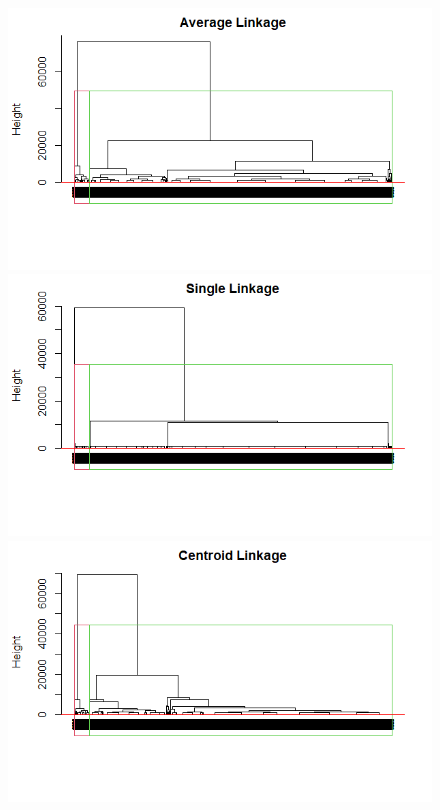 \documentclass[a4paper, 11pt]{article}
\begin{document}
\begin{figure}[H]
\begin{minipage}[b]{.4\textwidth}
	\caption{}
\end{minipage}
	\hfill
\begin{minipage}[b]{.4\textwidth}
	\includegraphics[width=\textwidth]{figure8.png}
	\caption{}
\end{minipage}
	\hfill
\begin{minipage}[b]{.4\textwidth}
	\includegraphics[width=\textwidth]{figure9.png}
	\caption{}
\end{minipage}
	\hfill
\begin{minipage}[b]{.4\textwidth}
	\includegraphics[width=\textwidth]{figure10.png}
	\caption{}
\end{minipage}
\end{figure}
\newpage


\end{document}
